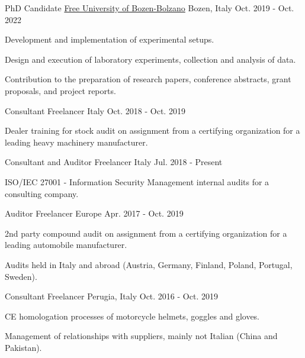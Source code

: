 \begin{cventries}
\cventry
{PhD Candidate}
{\href{https://unibz.it}{Free University of Bozen-Bolzano}}
{Bozen, Italy}
{Oct. 2019 - Oct. 2022}
{\begin{cvitems}
\item {Development and implementation of experimental setups.}
\item {Design and execution of laboratory experiments, collection and analysis of data.}
\item {Contribution to the preparation of research papers, conference abstracts, grant proposals, and project reports.}
\end{cvitems}}

\cventry
{Consultant}
{Freelancer}
{Italy}
{Oct. 2018 - Oct. 2019}
{\begin{cvitems}
\item {Dealer training for stock audit on assignment from a certifying organization for a leading heavy machinery manufacturer.}
\end{cvitems}}

\cventry
{Consultant and Auditor}
{Freelancer}
{Italy}
{Jul. 2018 - Present}
{\begin{cvitems}
\item {ISO/IEC 27001 - Information Security Management internal audits for a consulting company.}
\end{cvitems}}

\cventry
{Auditor}
{Freelancer}
{Europe}
{Apr. 2017 - Oct. 2019}
{\begin{cvitems}
\item {2nd party compound audit on assignment from a certifying organization for a leading automobile manufacturer.}
\item {Audits held in Italy and abroad (Austria, Germany, Finland, Poland, Portugal, Sweden).}
\end{cvitems}}

\cventry
{Consultant}
{Freelancer}
{Perugia, Italy}
{Oct. 2016 - Oct. 2019}
{\begin{cvitems}
\item {CE homologation processes of motorcycle helmets, goggles and gloves.}
\item {Management of relationships with suppliers, mainly not Italian (China and Pakistan).}
\end{cvitems}}

\end{cventries}